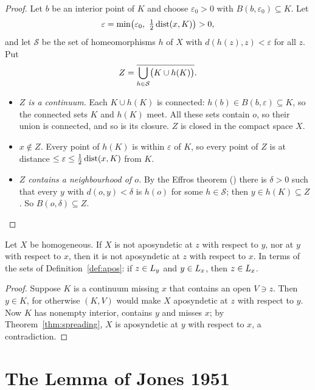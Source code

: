 \begin{proof}
Let $b$ be an interior point of $K$ and choose $\varepsilon_0>0$ with $B(b,\varepsilon_0)\subseteq K$. Let
\[
\varepsilon=\min\bigl(\varepsilon_0,\ \tfrac12\dist(x,K)\bigr)>0 ,
\]
and let $\mathcal S$ be the set of homeomorphisms $h$ of $X$ with $d(h(z),z)<\varepsilon$ for all $z$. Put
\[
Z=\overline{\bigcup_{h\in\mathcal S}\bigl(K\cup h(K)\bigr)} .
\]
\begin{itemize}
\item \emph{$Z$ is a continuum.} Each $K\cup h(K)$ is connected: $h(b)\in B(b,\varepsilon)\subseteq K$, so the
connected sets $K$ and $h(K)$ meet. All these sets contain $o$, so their union is connected, and so is its
closure. $Z$ is closed in the compact space $X$.
\item \emph{$x\notin Z$.} Every point of $h(K)$ is within $\varepsilon$ of $K$, so every point of $Z$ is at
distance $\le\varepsilon\le\frac12\operatorname{dist}(x,K)$ from $K$.
\item \emph{$Z$ contains a neighbourhood of $o$.} By the Effros theorem () there is
$\delta>0$ such that every $y$ with $d(o,y)<\delta$ is $h(o)$ for some $h\in\mathcal S$; then $y\in h(K)\subseteq Z$. So
$B(o,\delta)\subseteq Z$.\qedhere
\end{itemize}
\end{proof}


\begin{corollary}\label{cor:trans}
Let $X$ be homogeneous. If $X$ is not aposyndetic at $z$ with respect to $y$, nor at $y$ with respect to
$x$, then it is not aposyndetic at $z$ with respect to $x$. In terms of the sets of
Definition~\ref{def:apos}: if $z\in L_{y}$ and $y\in L_{x}$, then $z\in L_{x}$.
\end{corollary}

\begin{proof}
Suppose $K$ is a continuum missing $x$ that contains an open $V\ni z$. Then $y\in K$, for otherwise $(K,V)$
would make $X$ aposyndetic at $z$ with respect to $y$. Now $K$ has nonempty interior, contains $y$ and misses
$x$; by Theorem~\ref{thm:spreading}, $X$ is aposyndetic at $y$ with respect to $x$, a contradiction.
\end{proof}


\section{The Lemma of Jones 1951}

